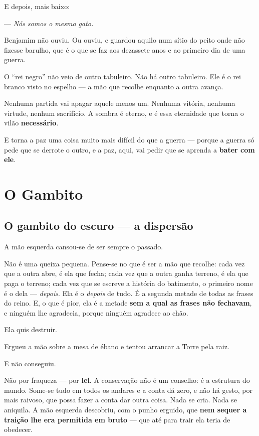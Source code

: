 \documentclass[livro.tex]{subfiles}
\begin{document}
E depois, mais baixo:

--- \emph{Nós somos o mesmo gato.}

\medskip

Benjamim não ouviu. Ou ouviu, e guardou aquilo num sítio do peito onde não fizesse barulho, que é o que se faz
aos dezassete anos e ao primeiro dia de uma guerra.

O ``rei negro'' não veio de outro tabuleiro. Não há outro tabuleiro. Ele é o rei branco visto no espelho --- a mão
que recolhe enquanto a outra avança.

Nenhuma partida vai apagar aquele menos um. Nenhuma vitória, nenhuma virtude, nenhum sacrifício. A sombra é
eterno, e é essa eternidade que torna o vilão \textbf{necessário}.

E torna a paz uma coisa muito mais difícil do que a guerra --- porque a guerra só pede que se derrote o outro, e a
paz, aqui, vai pedir que se aprenda a \textbf{bater com ele}.

\part{O Gambito}

\chapter{O gambito do escuro --- a dispersão}

A mão esquerda cansou-se de ser sempre o passado.

Não é uma queixa pequena. Pense-se no que é ser a mão que recolhe: cada vez que a outra abre, é ela que fecha; cada
vez que a outra ganha terreno, é ela que paga o terreno; cada vez que se escreve a história do batimento, o
primeiro nome é o dela --- \emph{depois}. Ela é o \emph{depois} de tudo. É a segunda metade de todas as frases do
reino. E, o que é pior, ela é a metade \textbf{sem a qual as frases não fechavam}, e ninguém lhe agradecia, porque
ninguém agradece ao chão.

Ela quis destruir.

Ergueu a mão sobre a mesa de ébano e tentou arrancar a Torre pela raiz.

E não conseguiu.

Não por fraqueza --- por \textbf{lei}. A conservação não é um conselho: é a estrutura do mundo. Some-se tudo em
todos os andares e a conta dá zero, e não há gesto, por mais raivoso, que possa fazer a conta dar outra coisa. Nada
se cria. Nada se aniquila. A mão esquerda descobriu, com o punho erguido, que \textbf{nem sequer a traição lhe era
permitida em bruto} --- que até para trair ela teria de obedecer.
\end{document}
